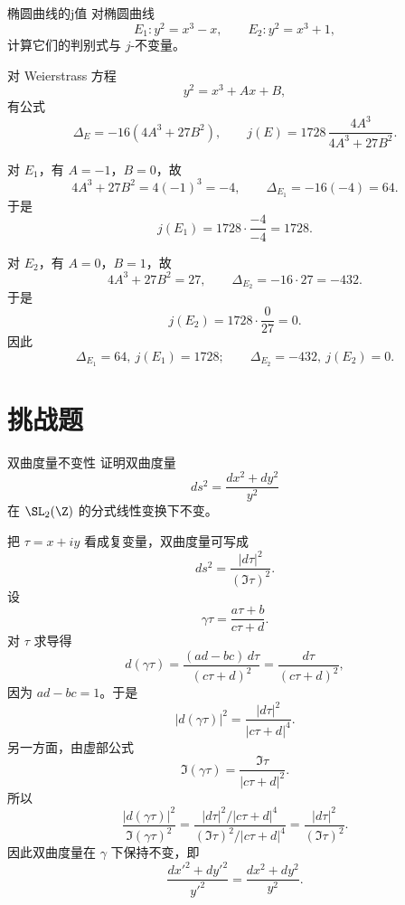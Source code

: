 \begin{problem}{椭圆曲线的j值}
\medium
对椭圆曲线
\[
E_1: y^2=x^3-x,
\qquad
E_2: y^2=x^3+1,
\]
计算它们的判别式与 $j$-不变量。
\end{problem}
\begin{solution}
对 Weierstrass 方程
\[
y^2=x^3+Ax+B,
\]
有公式
\[
\Delta_E=-16(4A^3+27B^2),
\qquad
j(E)=1728\,\frac{4A^3}{4A^3+27B^2}.
\]

对 $E_1$，有 $A=-1$，$B=0$，故
\[
4A^3+27B^2=4(-1)^3=-4,
\qquad
\Delta_{E_1}=-16(-4)=64.
\]
于是
\[
j(E_1)=1728\cdot\frac{-4}{-4}=1728.
\]

对 $E_2$，有 $A=0$，$B=1$，故
\[
4A^3+27B^2=27,
\qquad
\Delta_{E_2}=-16\cdot 27=-432.
\]
于是
\[
j(E_2)=1728\cdot\frac{0}{27}=0.
\]
因此
\[
\Delta_{E_1}=64,\ j(E_1)=1728;
\qquad
\Delta_{E_2}=-432,\ j(E_2)=0.
\]
\end{solution}

\section{挑战题 \hard}

\begin{problem}{双曲度量不变性}
\hard
证明双曲度量
\[
ds^2=\frac{dx^2+dy^2}{y^2}
\]
在 $\SL_2(\Z)$ 的分式线性变换下不变。
\end{problem}
\begin{solution}
把 $\tau=x+iy$ 看成复变量，双曲度量可写成
\[
ds^2=\frac{|d\tau|^2}{(\Im\tau)^2}.
\]
设
\[
\gamma\tau=\frac{a\tau+b}{c\tau+d}.
\]
对 $\tau$ 求导得
\[
d(\gamma\tau)=\frac{(ad-bc)\,d\tau}{(c\tau+d)^2}=\frac{d\tau}{(c\tau+d)^2},
\]
因为 $ad-bc=1$。于是
\[
|d(\gamma\tau)|^2=\frac{|d\tau|^2}{|c\tau+d|^4}.
\]
另一方面，由虚部公式
\[
\Im(\gamma\tau)=\frac{\Im\tau}{|c\tau+d|^2}.
\]
所以
\[
\frac{|d(\gamma\tau)|^2}{\Im(\gamma\tau)^2}
=\frac{|d\tau|^2/|c\tau+d|^4}{(\Im\tau)^2/|c\tau+d|^4}
=\frac{|d\tau|^2}{(\Im\tau)^2}.
\]
因此双曲度量在 $\gamma$ 下保持不变，即
\[
\frac{dx'^2+dy'^2}{y'^2}=\frac{dx^2+dy^2}{y^2}.
\]
\end{solution}

